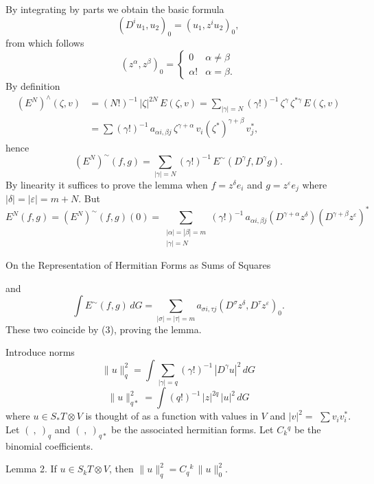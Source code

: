 \documentclass[11pt]{article}
\newcommand{\scanpage}[1]{\par\bigskip\noindent{\small\sffamily[scan #1]}\par}
\newcommand{\mspage}[1]{{\small\sffamily[p.\,#1]}}
\newcommand{\hand}[1]{\textcolor{blue}{#1}}
\begin{document}
By integrating by parts we obtain the basic formula
\[
(D^i u_1,u_2)_0=(u_1,z^i u_2)_0,
\]
from which follows
\[
(z^\alpha,z^\beta)_0=\begin{cases}0 & \alpha\neq\beta\\ \alpha! & \alpha=\beta.\end{cases}
\tag{3}
\]
By definition
\[
\begin{aligned}
(E^N)^\wedge(\zeta,v)&=(N!)^{-1}\,|\zeta|^{2N}\,E(\zeta,v)=\sum_{|\gamma|=N}(\gamma!)^{-1}\,\zeta^\gamma\,\zeta^{*\gamma}\,E(\zeta,v)\\
&=\sum(\gamma!)^{-1}\,a_{\alpha i,\beta j}\,\zeta^{\gamma+\alpha}\,v_i(\zeta^*)^{\gamma+\beta}\,v_j^*,
\end{aligned}
\]
hence
\[
(E^N)^\sim(f,g)=\sum_{|\gamma|=N}(\gamma!)^{-1}\,E^\sim(D^\gamma f,D^\gamma g).
\]
By linearity it suffices to prove the lemma when $f=z^\delta e_i$ and $g=z^\varepsilon e_j$
where $|\delta|=|\varepsilon|=m+N$. But
\[
E^N(f,g)=(E^N)^\sim(f,g)(0)=\sum_{\substack{|\alpha|=|\beta|=m\\ |\gamma|=N}}(\gamma!)^{-1}\,a_{\alpha i,\beta j}(D^{\gamma+\alpha}z^\delta)(D^{\gamma+\beta}z^\varepsilon)^*
\]

\mspage{\hand{51}}

\clearpage
\scanpage{162-5/52}
On the Representation of Hermitian Forms as Sums of Squares \mspage{239}

and
\[ \int E^{\sim}(f,g)\,dG = \sum_{|\sigma|=|\tau|=m} a_{\sigma i,\tau j}(D^{\sigma} z^{\delta}, D^{\tau} z^{\varepsilon})_0 . \]
These two coincide by (3), proving the lemma.

Introduce norms
\[ \|u\|_q^2 = \int \sum_{|\gamma|=q} (\gamma!)^{-1}\, |D^{\gamma} u|^2\, dG \]
\[ \|u\|_{q*}^2 = \int (q!)^{-1}\, |z|^{2q}\, |u|^2\, dG \]
where $u \in S_* T \otimes V$ is thought of as a function with values in $V$ and $|v|^2 =$
$\sum v_i v_i^*$. Let $(\ ,\ )_q$ and $(\ ,\ )_{q*}$ be the associated hermitian forms. Let
$C_k{}^q$ be the binomial coefficients.

Lemma 2. If $u \in S_k T \otimes V$, then $\|u\|_q^2 = C_q{}^k\, \|u\|_0^2$.
\end{document}
